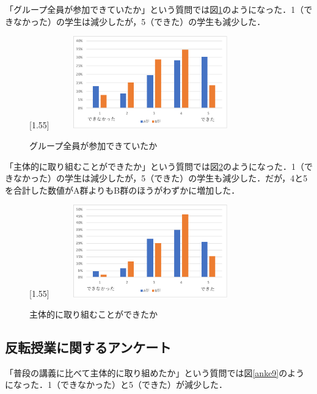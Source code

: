 \documentclass[a4j,11pt]{jsarticle}
\begin{document}
\newpage

「グループ全員が参加できていたか」という質問では図\ref{anke7}のようになった．1（できなかった）の学生は減少したが，5（できた）の学生も減少した．


\begin{figure}[h]
\begin{center}
\scalebox{1.2}[1.55]{
 \includegraphics[clip,width=85mm,height=40mm]{anke7.pdf}
 }
\end{center}
 \caption{グループ全員が参加できていたか}
 \label{anke7}
\end{figure}



「主体的に取り組むことができたか」という質問では図\ref{anke8}のようになった．1（できなかった）の学生は減少したが，5（できた）の学生も減少した．だが，4と5を合計した数値がA群よりもB群のほうがわずかに増加した．

\begin{figure}[h]
\begin{center}
\scalebox{1.2}[1.55]{
 \includegraphics[clip,width=85mm,height=40mm]{anke8.pdf}
 }
\end{center}
 \caption{主体的に取り組むことができたか}
 \label{anke8}
\end{figure}



\newpage
\subsection{反転授業に関するアンケート}

「普段の講義に比べて主体的に取り組めたか」という質問では図\ref{anke9}のようになった．1（できなかった）と5（できた）が減少した．
\end{document}
